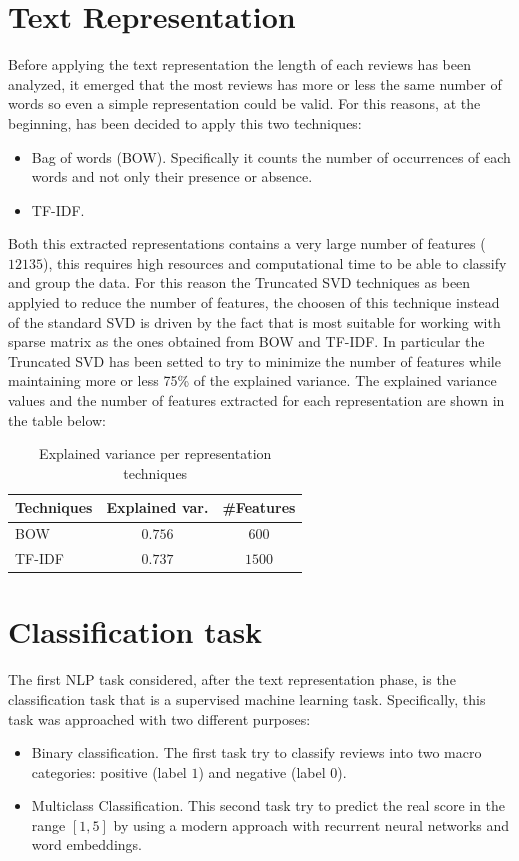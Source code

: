 \documentclass[11pt]{article}
\begin{document}
\section{Text Representation}
Before applying the text representation the length of each reviews has been analyzed, it emerged that the most reviews has more or less the same number of words so even a simple representation could be valid. For this reasons, at the beginning, has been decided to apply this two techniques:
\begin{itemize}
    \item Bag of words (BOW). Specifically it counts the number of occurrences of each words and not only their presence or absence.
    \item TF-IDF. 
\end{itemize}
Both this extracted representations contains a very large number of features ($12135$), this requires high resources and computational time to be able to classify and group the data. For this reason the Truncated SVD techniques as been applyied to reduce the number of features, the choosen of this technique instead of the standard SVD is driven by the fact that is most suitable for working with sparse matrix as the ones obtained from BOW and TF-IDF. In particular the Truncated SVD has been setted to try to minimize the number of features while maintaining more or less 75\% of the explained variance.
The explained variance values and the number of features extracted for each representation are shown in the table below:
\begin{table}[H]
    \begin{center}
        \begin{tabular}{||l||c|c||}
            \hline
            Techniques & Explained var. & \#Features\\
            \hline
            \hline
            BOW & $0.756$ & $600$\\
            \hline
            TF-IDF & $0.737$ & $1500$\\
            \hline
        \end{tabular}
    \caption{Explained variance per representation techniques}
    \end{center}
\end{table}


\section{Classification task}
The first NLP task considered, after the text representation phase, is the classification task that is a supervised machine learning task. Specifically, this task was approached with two different purposes: 
\begin{itemize}
    \item Binary classification. The first task try to classify reviews into two macro categories: positive (label $1$) and negative (label $0$).
    \item Multiclass Classification. This second task try to predict the real score in the range $[1,5]$ by using a modern approach with recurrent neural networks and word embeddings.
\end{itemize}
\end{document}
